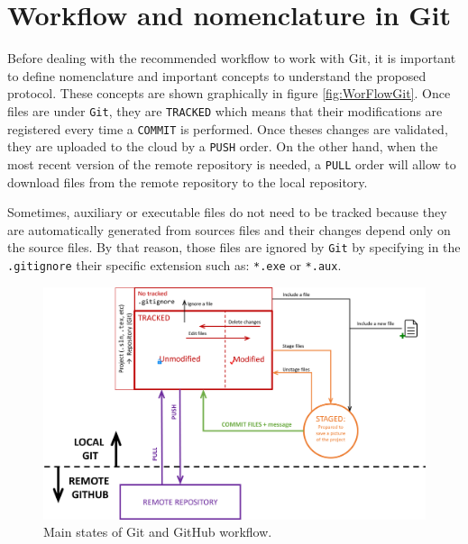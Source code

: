 \section{Workflow and nomenclature in Git}
Before dealing with the recommended workflow to work with Git, it is important
to define nomenclature  and important concepts to understand the proposed protocol.
These concepts are  shown graphically in figure \ref{fig:WorFlowGit}. 
Once files are under \texttt{Git}, they are \texttt{TRACKED} which means that their 
modifications are registered every time a \texttt{COMMIT} is performed. 
Once theses changes are validated, they are uploaded to the cloud by a \texttt{PUSH}  
order. On the other hand, 
when the most recent version of the remote repository is needed, a \texttt{PULL}  
order will allow to download  files from the remote repository to the local repository.  


Sometimes, auxiliary or executable files do not need to be tracked because 
they are automatically generated from sources files and their changes depend only on the
source files. By that reason, those files are ignored by \texttt{Git} by specifying in the 
\texttt{.gitignore} their specific extension such as: \texttt{*.exe} or \texttt{*.aux}.  
   
    
\begin{figure}[h]
    \centering
    \includegraphics[width = \textwidth]{Figures/GHStates.png}
    \caption{Main states of Git and GitHub workflow.}
    \label{fig:GitStates}
\end{figure} 

